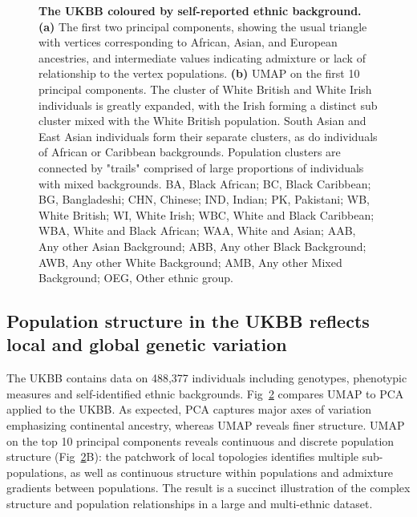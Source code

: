 \begin{figure}
\begin{subfigure}{.5\columnwidth}
\caption{}
\label{fig:umap_ukbb_pc10}
\end{subfigure}%
\caption[The UKBB coloured by self-reported ethnic background]{\textbf{The UKBB coloured by self-reported ethnic background.} \textbf{(a)} The first two principal components, showing the usual triangle with vertices corresponding to African, Asian, and European ancestries, and intermediate values indicating admixture or lack of relationship to the vertex populations. \textbf{(b)} UMAP on the first 10 principal components. The cluster of White British and White Irish individuals is greatly expanded, with the Irish forming a distinct sub cluster mixed with the White British population. South Asian and East Asian individuals form their separate clusters, as do individuals of African or Caribbean backgrounds. Population clusters are connected by "trails" comprised of large proportions of individuals with mixed backgrounds.
BA, Black African; 
BC, Black Caribbean; 
BG, Bangladeshi; 
CHN, Chinese; 
IND, Indian;
PK, Pakistani;
WB, White British;
WI, White Irish;
WBC, White and Black Caribbean; 
WBA, White and Black African; 
WAA, White and Asian;
AAB, Any other Asian Background; 
ABB, Any other Black Background;
AWB, Any other White Background;
AMB, Any other Mixed Background;
OEG, Other ethnic group.
}
\label{fig:fig3}
\end{figure}

\clearpage

\subsection{Population structure in the UKBB reflects local and global genetic variation}

The UKBB contains data on 488,377 individuals including genotypes, phenotypic measures and self-identified ethnic backgrounds. Fig~\ref{fig:fig3} compares UMAP to PCA applied to the UKBB. As expected, PCA captures major axes of variation emphasizing continental ancestry, whereas UMAP reveals finer structure. UMAP on the top 10 principal components reveals continuous and discrete population structure (Fig~\ref{fig:fig3}B): the patchwork of local topologies identifies multiple sub-populations, as well as continuous structure within populations and admixture gradients between populations. The result is a succinct illustration of the complex structure and population relationships in a large and multi-ethnic dataset.

